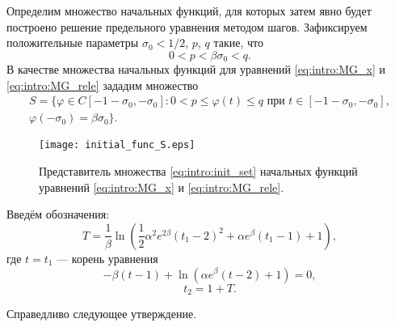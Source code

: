 Определим множество начальных функций, для которых затем явно будет построено решение предельного уравнения методом шагов. Зафиксируем положительные параметры $\sigma_0 < 1/2$, $p$, $q$ такие, что 
%
\[0 < p < \beta \sigma_0 < q.\]
%
В качестве множества начальных функций для уравнений \eqref{eq:intro:MG_x} и \eqref{eq:intro:MG_rele} зададим множество
\begin{multline}
	\label{eq:intro:init_set}
	S=\{\varphi\in C[-1 - \sigma_0, -\sigma_0]: 0 < p \leqslant \varphi(t)\leqslant q \text{ при } t \in [-1 - \sigma_0, -\sigma_0],\\ \varphi(-\sigma_0) = \beta \sigma_0 \}.
\end{multline}

\begin{figure}
	\centering
	\texttt{[image: initial\_func\_S.eps]}
	\caption{Представитель множества \eqref{eq:intro:init_set} начальных функций уравнений \eqref{eq:intro:MG_x} и \eqref{eq:intro:MG_rele}.}
	\label{fig:intro:initial_funcs:ch1}
\end{figure}

Введём обозначения:
\begin{equation}
	\label{eq:intro:T}
	T = \frac{1}{\beta} \ln\left(\frac{1}{2}\alpha^2e^{2\beta}(t_1 - 2)^2 + \alpha e^{\beta}(t_1 - 1) + 1\right),
\end{equation}
где $t = t_1$ --- корень уравнения 
\begin{equation}
	\label{eq:intro:t1_cond_exp}
	-\beta(t - 1) + \ln(\alpha e^{\beta}(t - 2) + 1) = 0,
\end{equation}
\begin{equation}
	\label{eq:intro:t2_period}
	t_2 = 1 + T.
\end{equation}

Справедливо следующее утверждение.

